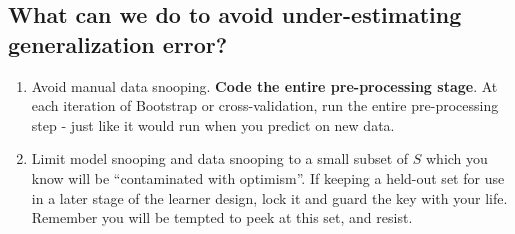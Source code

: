 \subsection{What can we do to avoid under-estimating generalization error?}

\begin{enumerate}
  \item Avoid manual data snooping. {\bf Code the entire pre-processing stage}.
    At each iteration of Bootstrap or cross-validation, run the entire
    pre-processing step - just like it would run when you predict on new data.
  \item Limit model snooping and data snooping to a small subset of $S$ which
    you know will be ``contaminated with optimism''. If keeping a held-out set
    for use in a later stage of the learner design, lock it and guard the key
    with your life. Remember you will be tempted to peek at this set, and
    resist. 
\end{enumerate}




